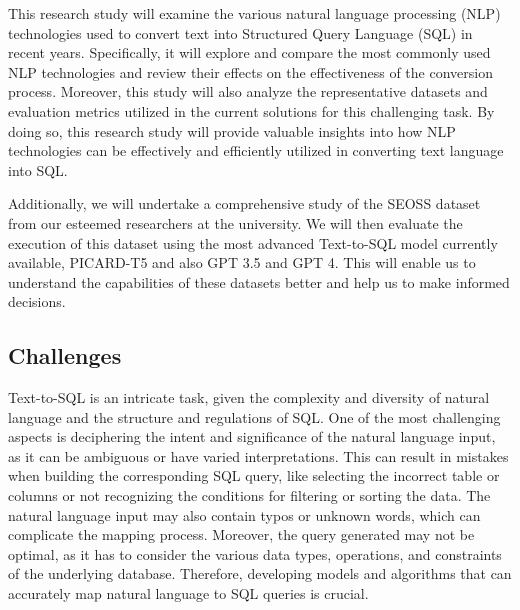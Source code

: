 This research study will examine the various natural language processing (NLP) technologies used to convert text into Structured Query Language (SQL) in recent years. Specifically, it will explore and compare the most commonly used NLP technologies and review their effects on the effectiveness of the conversion process. Moreover, this study will also analyze the representative datasets and evaluation metrics utilized in the current solutions for this challenging task. By doing so, this research study will provide valuable insights into how NLP technologies can be effectively and efficiently utilized in converting text language into SQL.

Additionally, we will undertake a comprehensive study of the SEOSS dataset from our esteemed researchers at the university. We will then evaluate the execution of this dataset using the most advanced Text-to-SQL model currently available, PICARD-T5 and also GPT 3.5 and GPT 4. This will enable us to understand the capabilities of these datasets better and help us to make informed decisions.

\clearpage
\subsection{Challenges}

Text-to-SQL is an intricate task, given the complexity and diversity of natural language and the structure and regulations of SQL. One of the most challenging aspects is deciphering the intent and significance of the natural language input, as it can be ambiguous or have varied interpretations. This can result in mistakes when building the corresponding SQL query, like selecting the incorrect table or columns or not recognizing the conditions for filtering or sorting the data. The natural language input may also contain typos or unknown words, which can complicate the mapping process. Moreover, the query generated may not be optimal, as it has to consider the various data types, operations, and constraints of the underlying database. Therefore, developing models and algorithms that can accurately map natural language to SQL queries is crucial.

